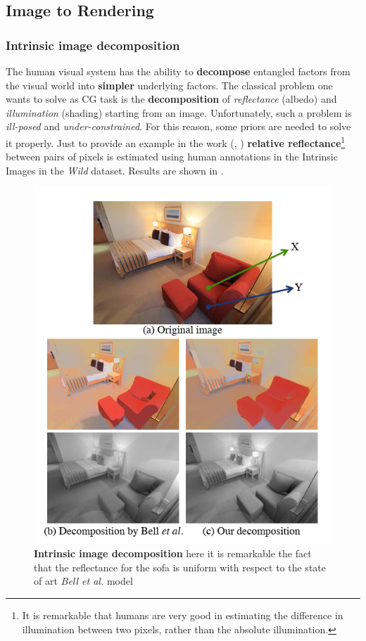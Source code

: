 \subsection{Image to Rendering}

\subsubsection{Intrinsic image decomposition}
The human visual system has the ability to \textbf{decompose} entangled factors from the visual world into \textbf{simpler} underlying factors. The classical problem one wants to solve as CG task is the \textbf{decomposition} of \textit{reflectance} (albedo) and \textit{illumination} (shading) starting from an image. Unfortunately, such a problem is \textit{ill-posed} and \textit{under-constrained}. For this reason, some priors are needed to solve it properly. Just to provide an example in the work  \cite{Zhou2015}  (\citeauthor{Zhou2015}, \citeyear{Zhou2015}) \textbf{relative reflectance}\footnote{
    It is remarkable that humans are very good in estimating the difference in illumination between two pixels, rather than the absolute illumination.
} between pairs of pixels is estimated using human annotations in the Intrinsic Images in the \textit{Wild} dataset. Results are shown in .

\begin{figure}
    \centering
    \includegraphics[scale=0.7]{img/Zhou.png}
    \caption{\textbf{Intrinsic image decomposition} here it is remarkable the fact that the reflectance for the sofa is uniform with respect to the state of art \textit{Bell et al.} model}
    \label{img:Zhou}
\end{figure}

